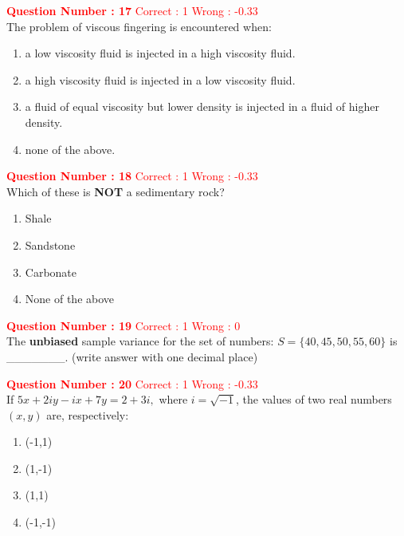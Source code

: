 \documentclass[12pt]{article}
\begin{document}
{\vspace{2ex}

\textbf{\textcolor{red}{Question Number : 17}} \hfill \textcolor{red}{Correct : 1  Wrong : -0.33} \\[1ex]
The problem of viscous fingering is encountered when:

\begin{enumerate}[label=(\Alph*)]
    \item a low viscosity fluid is injected in a high viscosity fluid.
    \item a high viscosity fluid is injected in a low viscosity fluid.
    \item a fluid of equal viscosity but lower density is injected in a fluid of higher density.
    \item none of the above.
\end{enumerate}

\vspace{2ex}

\textbf{\textcolor{red}{Question Number : 18}} \hfill \textcolor{red}{Correct : 1  Wrong : -0.33} \\[1ex]
Which of these is \textbf{NOT} a sedimentary rock?

\begin{enumerate}[label=(\Alph*)]
    \item Shale
    \item Sandstone
    \item Carbonate
    \item None of the above
\end{enumerate}

\vspace{2ex}


\textbf{\textcolor{red}{Question Number : 19}} \hfill \textcolor{red}{Correct : 1  Wrong : 0} \\[1ex]
The \textbf{unbiased} sample variance for the set of numbers: $S = \{40, 45, 50, 55, 60\}$ is \_\_\_\_\_\_\_. (write answer with one decimal place)

\vspace{3ex}


\textbf{\textcolor{red}{Question Number : 20}} \hfill \textcolor{red}{Correct : 1  Wrong : -0.33} \\[1ex]
If {\LARGE$ 
5x + 2iy - ix + 7y = 2 + 3i,
$ }
where $i = \sqrt{-1}$, the values of two real numbers $(x, y)$ are, respectively:

\begin{enumerate}[label=(\Alph*)]
    \item (-1,1)
    \item (1,-1)
    \item (1,1)
    \item (-1,-1)
\end{enumerate}

}
\end{document}
